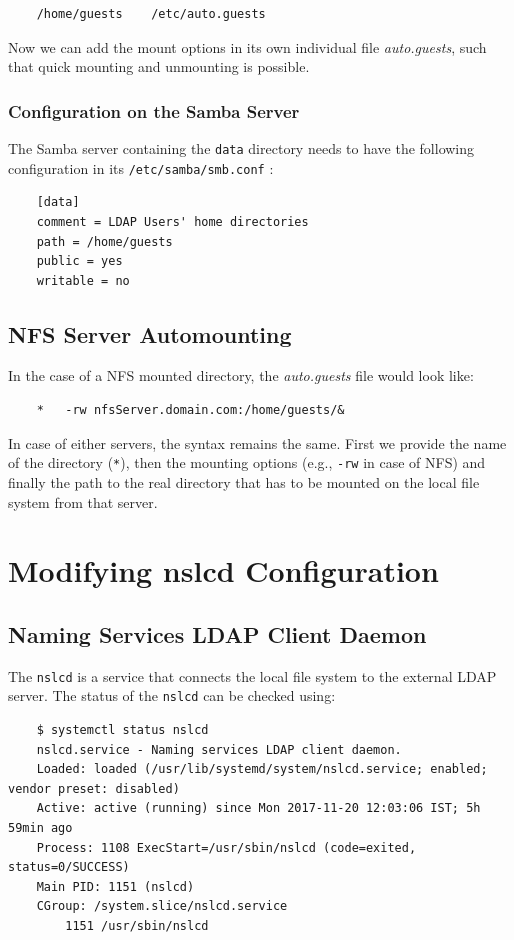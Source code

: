 \documentclass{report}
\begin{document}
	\begin{verbatim}
	/home/guests	/etc/auto.guests
	\end{verbatim}
	
	Now we can add the mount options in its own individual file \textit{auto.guests}, such that quick mounting and unmounting is possible. 
	
	\subsubsection{Configuration on the Samba Server}
	The Samba server containing the \verb|data| directory needs to have the following configuration in its \verb|/etc/samba/smb.conf| :
	
	\vspace{-10pt}
	\begin{verbatim}
	[data]
	comment = LDAP Users' home directories
	path = /home/guests
	public = yes
	writable = no
	\end{verbatim}
	
	\subsection{NFS Server Automounting}
	
	In the case of a NFS mounted directory, the \textit{auto.guests} file would look like:
	
	\begin{verbatim}
	*	-rw	nfsServer.domain.com:/home/guests/&
	\end{verbatim}
	
	\noindent
	In case of either servers, the syntax remains the same. First we provide the name of the directory (\verb|*|), then the mounting options (e.g., \verb|-rw| in case of NFS) and finally the path to the real directory that has to be mounted on the local file system from that server.
	
	\section{Modifying nslcd Configuration}
	\subsection{Naming Services LDAP Client Daemon}
	The \verb|nslcd| is a service that connects the local file system to the external LDAP server. The status of the \verb|nslcd| can be checked using:
	
	\vspace{-15pt}
	\begin{verbatim}
	$ systemctl status nslcd
	nslcd.service - Naming services LDAP client daemon.
	Loaded: loaded (/usr/lib/systemd/system/nslcd.service; enabled; vendor preset: disabled)
	Active: active (running) since Mon 2017-11-20 12:03:06 IST; 5h 59min ago
	Process: 1108 ExecStart=/usr/sbin/nslcd (code=exited, status=0/SUCCESS)
	Main PID: 1151 (nslcd)
	CGroup: /system.slice/nslcd.service
		1151 /usr/sbin/nslcd
	\end{verbatim}
	\vspace{-10pt}
	
\end{document}
